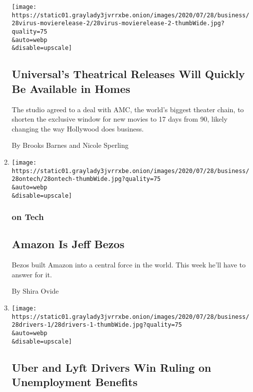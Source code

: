 \begin{enumerate}
  \texttt{[image: https://static01.graylady3jvrrxbe.onion/images/2020/07/28/business/28virus-movierelease-2/28virus-movierelease-2-thumbWide.jpg?quality=75\\\&auto=webp\\\&disable=upscale]}

  \hypertarget{universals-theatrical-releases-will-quickly-be-available-in-homes}{%
  \subsection{Universal's Theatrical Releases Will Quickly Be Available
  in
  Homes}\label{universals-theatrical-releases-will-quickly-be-available-in-homes}}

  The studio agreed to a deal with AMC, the world's biggest theater
  chain, to shorten the exclusive window for new movies to 17 days from
  90, likely changing the way Hollywood does business.

  By Brooks Barnes and Nicole Sperling
\item
  \href{/2020/07/28/technology/amazon-jeff-bezos.html}{}

  \texttt{[image: https://static01.graylady3jvrrxbe.onion/images/2020/07/28/business/28ontech/28ontech-thumbWide.jpg?quality=75\\\&auto=webp\\\&disable=upscale]}

  \hypertarget{on-tech-1}{%
  \subsubsection{on Tech}\label{on-tech-1}}

  \hypertarget{amazon-is-jeff-bezos}{%
  \subsection{Amazon Is Jeff Bezos}\label{amazon-is-jeff-bezos}}

  Bezos built Amazon into a central force in the world. This week he'll
  have to answer for it.

  By Shira Ovide
\item
  \href{/2020/07/28/business/economy/lyft-uber-drivers-unemployment.html}{}

  \texttt{[image: https://static01.graylady3jvrrxbe.onion/images/2020/07/28/business/28drivers-1/28drivers-1-thumbWide.jpg?quality=75\\\&auto=webp\\\&disable=upscale]}

  \hypertarget{uber-and-lyft-drivers-win-ruling-on-unemployment-benefits}{%
  \subsection{Uber and Lyft Drivers Win Ruling on Unemployment
  Benefits}\label{uber-and-lyft-drivers-win-ruling-on-unemployment-benefits}}


\end{enumerate}
